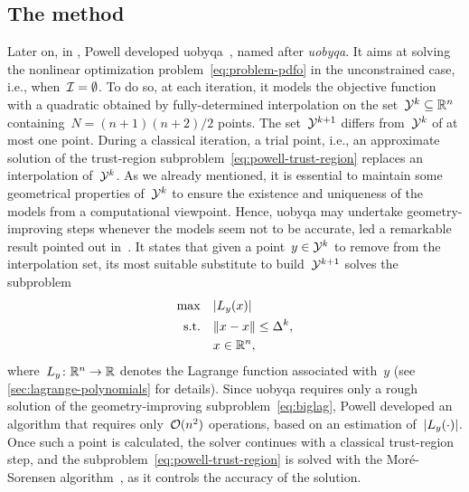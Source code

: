 \subsection{The  method}
\label{subsec:uobyqa}

Later on, in , Powell developed \gls{uobyqa}~\cite{Powell_2002}, named after \emph{\glsdesc{uobyqa}}.
It aims at solving the nonlinear optimization problem~\cref{eq:problem-pdfo} in the unconstrained case, i.e., when~$\mathcal{I} = \emptyset$.
To do so, at each iteration, it models the objective function with a quadratic obtained by fully-determined interpolation on the set~$\xpt[k] \subseteq \R^n$ containing~$N = (n + 1)(n + 2) / 2$ points.
The set~$\xpt[k + 1]$ differs from~$\xpt[k]$ of at most one point.
During a classical iteration, a trial point, i.e., an approximate solution of the trust-region subproblem~\cref{eq:powell-trust-region} replaces an interpolation of~$\xpt[k]$.
As we already mentioned, it is essential to maintain some geometrical properties of~$\xpt[k]$ to ensure the existence and uniqueness of the models from a computational viewpoint.
Hence, \gls{uobyqa} may undertake geometry-improving steps whenever the models seem not to be accurate, led a remarkable result pointed out in~\cite{Powell_2001}.
It states that given a point~$y \in \xpt[k]$ to remove from the interpolation set, its most suitable substitute to build~$\xpt[k + 1]$ solves the subproblem
\begin{subequations}
    \label{eq:biglag}
    \begin{align}
        \max        & \quad \abs{\lagp[y](x)}\\
        \text{s.t.} & \quad \norm{x - \iter} \le \rad[k],\\
                    & \quad x \in \R^n,
    \end{align}
\end{subequations}
where~$\lagp[y] \colon \R^n \to \R$ denotes the Lagrange function associated with~$y$ (see \cref{sec:lagrange-polynomials} for details).
Since \gls{uobyqa} requires only a rough solution of the geometry-improving subproblem~\cref{eq:biglag}, Powell developed an algorithm that requires only~$\operatorname{\mathcal{O}}(n^2)$ operations, based on an estimation of~$\abs{\lagp[y](\cdot)}$.
Once such a point is calculated, the solver continues with a classical trust-region step, and the subproblem~\cref{eq:powell-trust-region} is solved with the Mor{\'{e}}-Sorensen algorithm~\cite{More_Sorensen_1983}, as it controls the accuracy of the solution.

